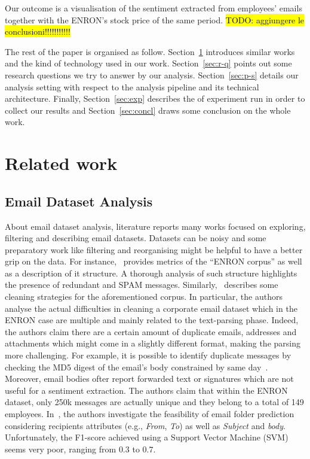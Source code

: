 \documentclass{vldb}
\newcommand{\hlc}[2][lightcyan]{{\sethlcolor{#1}\hl{#2}}}
\begin{document}
Our outcome is a visualisation of the sentiment extracted from employees' emails together with the ENRON's stock price of the same period.
\hlc{TODO: aggiungere le conclusioni!!!!!!!!!!!}

The rest of the paper is organised as follow.
Section~\ref{sec:r-w} introduces similar works and the kind of technology used in our work.
Section~\ref{sec:r-q} points out some research questions we try to answer by our analysis.
Section~\ref{sec:p-s} details our analysis setting with respect to the analysis pipeline and its technical architecture. 
Finally, Section~\ref{sec:exp} describes the of experiment run in order to collect our results and Section~\ref{sec:concl} draws some conclusion on the whole work.



\section{Related work}
\label{sec:r-w}

\subsection{Email Dataset Analysis}
About email dataset analysis, literature reports many works focused on exploring, filtering and describing email datasets.
Datasets can be noisy and some preparatory work like filtering and reorganising might be helpful to have a better grip on the data.
For instance,~\cite{klimt2004introducing} provides metrics of the ``ENRON corpus'' as well as a description of it structure.
A thorough analysis of such structure highlights the presence of redundant and SPAM messages.
Similarly,~\cite{zhou2007strategies} describes some cleaning strategies for the aforementioned corpus.
In particular, the authors analyse the actual difficulties in cleaning a corporate email dataset which in the ENRON case are multiple and mainly related to the text-parsing phase.
Indeed, the authors claim there are a certain amount of duplicate emails, addresses and attachments which might come in a slightly different format, making the parsing more challenging.
For example, it is possible to identify duplicate messages by checking the MD5 digest of the email's body constrained by same day~\cite{corrada2004enron}.
Moreover, email bodies ofter report forwarded text or signatures which are not useful for a sentiment extraction.
The authors claim that within the ENRON dataset, only 250k messages are actually unique and they belong to a total of 149 employees.
In~\cite{klimt2004enron}, the authors investigate the feasibility of email folder prediction considering recipients attributes (e.g., \textit{From}, \textit{To}) as well as \textit{Subject} and \textit{body}.
Unfortunately, the F1-score achieved using a Support Vector Machine (SVM) seems very poor, ranging from $0.3$ to $0.7$. 
\end{document}
